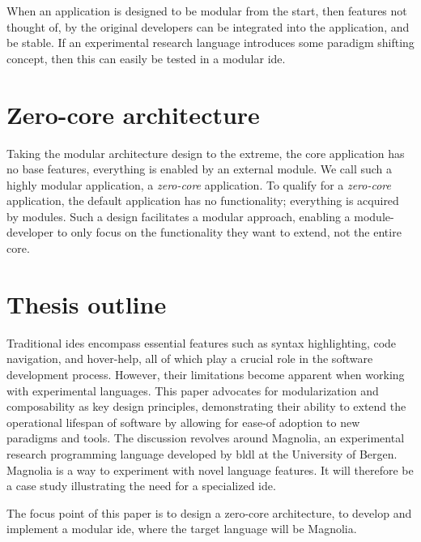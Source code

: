 \begin{hyp} \label{hyp:modular}
  When an application is designed to be modular from the start, then features
  not thought of, by the original developers can be integrated into the
  application, and be stable. If an experimental research language introduces
  some paradigm shifting concept, then this can easily be tested in a modular
  \gls*{ide}.
\end{hyp}

\section{Zero-core architecture}

Taking the modular architecture design to the extreme, the core application has
no base features, everything is enabled by an external module. We call such a
highly modular application, a \textit{zero-core} application. To qualify for a
\textit{zero-core} application, the default application has no functionality;
everything is acquired by modules. Such a design facilitates a modular approach,
enabling a module-developer to only focus on the functionality they want to
extend, not the entire core.

\section{Thesis outline}

Traditional \gls*{ide}s encompass essential features such as syntax highlighting,
code navigation, and hover-help, all of which play a crucial role in the
software development process. However, their limitations become apparent when
working with experimental languages. This paper advocates for modularization and
composability as key design principles, demonstrating their ability to extend
the operational lifespan of software by allowing for ease-of adoption to new
paradigms and tools. The discussion revolves around Magnolia, an experimental
research programming language developed by \gls*{bldl} at the University of
Bergen. Magnolia is a way to experiment with novel language features. It will
therefore be a case study illustrating the need for a specialized \gls*{ide}.

The focus point of this paper is to design a zero-core architecture, to develop
and implement a modular \gls*{ide}, where the target language will be Magnolia.

